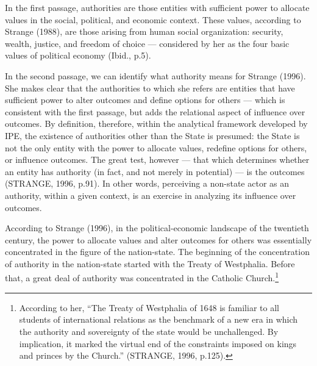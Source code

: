 In the first passage, authorities are those entities with sufficient power to allocate values in the social, political, and economic context. These values, according to Strange (1988), are those arising from human social organization: security, wealth, justice, and freedom of choice --- considered by her as the four basic values of political economy (Ibid., p.5).

In the second passage, we can identify what authority means for Strange (1996). She makes clear that the authorities to which she refers are entities that have sufficient power to alter outcomes and define options for others --- which is consistent with the first passage, but adds the relational aspect of influence over outcomes. By definition, therefore, within the analytical framework developed by IPE, the existence of authorities other than the State is presumed: the State is not the only entity with the power to allocate values, redefine options for others, or influence outcomes. The great test, however --- that which determines whether an entity has authority (in fact, and not merely in potential) --- is the outcomes (STRANGE, 1996, p.91). In other words, perceiving a non-state actor as an authority, within a given context, is an exercise in analyzing its influence over outcomes.

According to Strange (1996), in the political-economic landscape of the twentieth century, the power to allocate values and alter outcomes for others was essentially concentrated in the figure of the nation-state. The beginning of the concentration of authority in the nation-state started with the Treaty of Westphalia. Before that, a great deal of authority was concentrated in the Catholic Church.\footnote{According to her, ``The Treaty of Westphalia of 1648 is familiar to all students of international relations as the benchmark of a new era in which the authority and sovereignty of the state would be unchallenged. By implication, it marked the virtual end of the constraints imposed on kings and princes by the Church.'' (STRANGE, 1996, p.125).}

